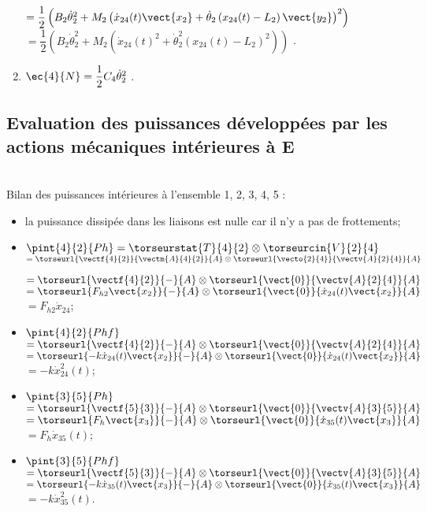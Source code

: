 \begin{multicols}{2}
\begin{corrige}
\begin{enumerate}
$=\dfrac{1}{2}\left( B_2 \dot{\theta}_2^2 +M_2\left(\dot{x}_{24}(t)  \vect{x_2}+\dot{\theta}_2\left(  x_{24}(t)  -L_2 \right)\vect{y_2}\right)^2  \right)
$ 
$=\dfrac{1}{2}\left( B_2 \dot{\theta}_2^2 +M_2\left(\dot{x}_{24}(t)^2+\dot{\theta}_2^2\left(  x_{24}(t)  -L_2 \right)^2\right)  \right)
$ 
.
\item $\ec{4}{N}=\dfrac{1}{2}C_4\dot{\theta}_2^2$ . 
\end{enumerate}
\end{corrige}
\else
\fi


\subsection*{Evaluation des puissances développées par les actions mécaniques intérieures à E}
\ifprof
\begin{corrige} ~\\

Bilan des puissances intérieures à l'ensemble 1, 2, 3, 4, 5 :
\begin{itemize}
\item la puissance dissipée dans les liaisons est nulle car il n'y a pas de frottements;
\item  $\pint{4}{2}{Ph} = \torseurstat{T}{4}{2}\otimes \torseurcin{V}{2}{4}$ 
$=\torseurl{\vectf{4}{2}}{\vectm{A}{4}{2}}{A}\otimes \torseurl{\vecto{2}{4}}{\vectv{A}{2}{4}}{A}$ 

 $=\torseurl{\vectf{4}{2}}{-}{A}\otimes \torseurl{\vect{0}}{\vectv{A}{2}{4}}{A}$
  $=\torseurl{F_{h2}\vect{x_2}}{-}{A}\otimes \torseurl{\vect{0}}{ \dot{x}_{24}(t)  \vect{x_2}}{A}$
  $=F_{h2}\dot{x}_{24}$;

  \item  $\pint{4}{2}{Phf}  $
 $=\torseurl{\vectf{4}{2}}{-}{A}\otimes \torseurl{\vect{0}}{\vectv{A}{2}{4}}{A}$
  $=\torseurl{-k\dot{x}_{24}(t)  \vect{x_2}}{-}{A}\otimes \torseurl{\vect{0}}{ \dot{x}_{24}(t)  \vect{x_2}}{A}$  $=-k\dot{x}_{24}^2(t)$;
\item  $\pint{3}{5}{Ph}  $
$=\torseurl{\vectf{5}{3}}{-}{A}\otimes \torseurl{\vect{0}}{\vectv{A}{3}{5}}{A}$
$=\torseurl{F_h  \vect{x_3}}{-}{A}\otimes \torseurl{\vect{0}}{ \dot{x}_{35}(t)  \vect{x_3}}{A}$ $=F_h\dot{x}_{35}(t)$;
\item  $\pint{3}{5}{Phf}  $
$=\torseurl{\vectf{5}{3}}{-}{A}\otimes \torseurl{\vect{0}}{\vectv{A}{3}{5}}{A}$
$=\torseurl{-k\dot{x}_{35}(t)  \vect{x_3}}{-}{A}\otimes \torseurl{\vect{0}}{ \dot{x}_{35}(t)  \vect{x_3}}{A}$ $=-k\dot{x}_{35}^2(t)$.
\end{itemize}


\end{corrige}
\end{multicols}
